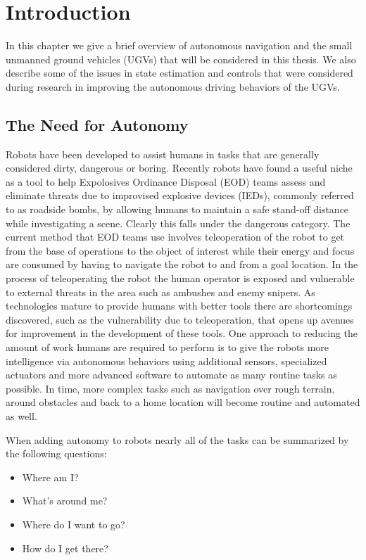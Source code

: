 \chapter{Introduction}
\label{ch:introduction}
In this chapter we give a brief overview of autonomous navigation and the small unmanned ground vehicles (UGVs) that will be considered in this thesis. We also describe some of the issues in state estimation and controls that were considered during research in improving the autonomous driving behaviors of the UGVs.

\section{The Need for Autonomy}
\label{sec:needforautonomy}
Robots have been developed to assist humans in tasks that are generally considered dirty, dangerous or boring. Recently robots have found a useful niche as a tool to help Expolosives Ordinance Disposal (EOD) teams assess and eliminate threats due to improvised explosive devices (IEDs), commonly referred to as roadside bombs, by allowing humans to maintain a safe stand-off distance while investigating a scene. Clearly this falls under the dangerous category. The current method that EOD teams use involves teleoperation of the robot to get from the base of operations to the object of interest while their energy and focus are consumed by having to navigate the robot to and from a goal location. In the process of teleoperating the robot the human operator is exposed and vulnerable to external threats in the area such as ambushes and enemy snipers. As technologies mature to provide humans with better tools there are shortcomings discovered, such as the vulnerability due to teleoperation, that opens up avenues for improvement in the development of these tools. One approach to reducing the amount of work humans are required to perform is to give the robots more intelligence via autonomous behaviors using additional sensors, specialized actuators and more advanced software to automate as many routine tasks as possible. In time, more complex tasks such as navigation over rough terrain, around obstacles and back to a home location will become routine and automated as well.

When adding autonomy to robots nearly all of the tasks can be summarized by the following questions:
\begin{itemize}
\item Where am I?
\item What's around me?
\item Where do I want to go?
\item How do I get there?
\end{itemize}

